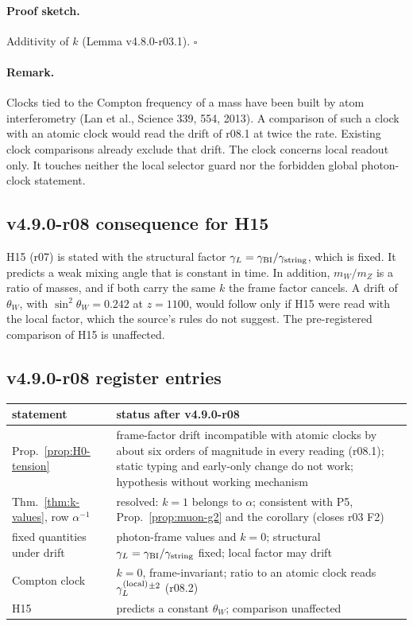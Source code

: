 \paragraph{Proof sketch.}
Additivity of \(k\) (Lemma v4.8.0-r03.1).  \(\square\)

\paragraph{Remark.}
Clocks tied to the Compton frequency of a mass have been built by atom interferometry (Lan et al., Science 339, 554, 2013).
A comparison of such a clock with an atomic clock would read the drift of r08.1 at twice the rate.  Existing clock
comparisons already exclude that drift.  The clock concerns local readout only.  It touches neither the local selector
guard nor the forbidden global photon-clock statement.

\subsection*{v4.9.0-r08 consequence for H15}
\label{subsec:v490-r08-h15}

H15 (r07) is stated with the structural factor \(\gamma_L=\gamma_{\mathrm{BI}}/\gamma_{\mathrm{string}}\), which is fixed.  It predicts a weak mixing angle that
is constant in time.  In addition, \(m_W/m_Z\) is a ratio of masses, and if both carry the same \(k\) the frame factor
cancels.  A drift of \(\theta_W\), with \(\sin^2\theta_W=0.242\) at \(z=1100\), would follow only if H15 were read with the
local factor, which the source's rules do not suggest.  The pre-registered comparison of H15 is unaffected.

\subsection*{v4.9.0-r08 register entries}
\label{subsec:v490-r08-register}

\begin{center}
\small
\begin{tabular}{@{}>{\raggedright\arraybackslash}p{}>{\raggedright\arraybackslash}p{}@{}}
\toprule
statement & status after v4.9.0-r08\\
\midrule
Prop.~\ref{prop:H0-tension} & frame-factor drift incompatible with atomic clocks by about six orders of magnitude in every reading (r08.1); static typing and early-only change do not work; hypothesis without working mechanism\\
Thm.~\ref{thm:k-values}, row \(\alpha^{-1}\) & resolved: \(k=1\) belongs to \(\alpha\); consistent with P5, Prop.~\ref{prop:muon-g2} and the corollary (closes r03 F2)\\
fixed quantities under drift & photon-frame values and \(k=0\); structural \(\gamma_L=\gamma_{\mathrm{BI}}/\gamma_{\mathrm{string}}\) fixed; local factor may drift\\
Compton clock & \(k=0\), frame-invariant; ratio to an atomic clock reads \(\gamma_L^{(\mathrm{local})}{}^{\pm2}\) (r08.2)\\
H15 & predicts a constant \(\theta_W\); comparison unaffected\\
\bottomrule
\end{tabular}
\end{center}

